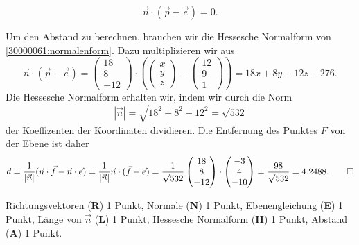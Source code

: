 \begin{loesung}
\begin{teilaufgaben}
\begin{equation}
\vec{n}\cdot (\vec{p}-\vec{e})=0.
\label{30000061:normalenform}
\end{equation}
\item
Um den Abstand zu berechnen, brauchen wir die Hessesche Normalform
von \eqref{30000061:normalenform}.
Dazu multiplizieren wir aus
\[
\vec{n}\cdot (\vec{p}-\vec{e})
=
\begin{pmatrix} 18\\8\\-12 \end{pmatrix}
\cdot\left(
\begin{pmatrix}x\\y\\z\end{pmatrix}
-
\begin{pmatrix}12\\9\\1\end{pmatrix}
\right)
=
18x+8y-12z-276.
\]
Die Hessesche Normalform erhalten wir, indem wir durch die Norm
\[
|\vec{n}|
=
\sqrt{18^2+8^2+12^2}
=
\sqrt{532}
\]
der Koeffizenten der Koordinaten dividieren.
Die Entfernung des Punktes $F$ von der Ebene ist daher
\[
d
=
\frac{1}{|\vec{n}|}
(\vec{n}\cdot\vec{f}-\vec{n}\cdot\vec{e})
=
\frac{1}{|\vec{n}|}
\vec{n}\cdot(\vec{f}-\vec{e})
=
\frac1{\sqrt{532}}
\begin{pmatrix}18\\8\\-12\end{pmatrix}
\cdot
\begin{pmatrix}-3\\4\\-10\end{pmatrix}
=
\frac{98}{\sqrt{532}}
=
4.2488.
\qedhere
\]
\end{teilaufgaben}
\end{loesung}

\begin{bewertung}
Richtungsvektoren ({\bf R}) 1 Punkt,
Normale ({\bf N}) 1 Punkt,
Ebenengleichung ({\bf E}) 1 Punkt,
Länge von $\vec{n}$ ({\bf L}) 1 Punkt,
Hessesche Normalform ({\bf H}) 1 Punkt,
Abstand ({\bf A}) 1 Punkt.
\end{bewertung}


